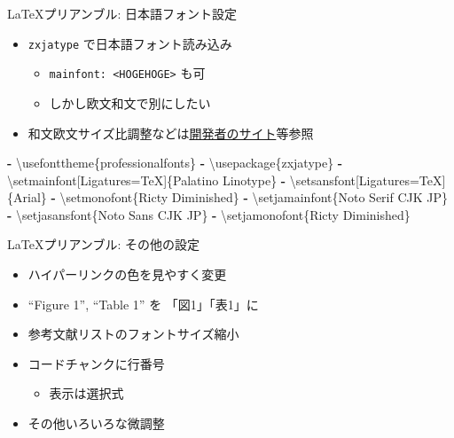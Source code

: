 \documentclass[
  14pt,
  ignorenonframetext,
]{beamer}
\newenvironment{Shaded}{\begin{snugshade}}{\end{snugshade}}
\newcommand{\AttributeTok}[1]{\textcolor[rgb]{0.77,0.63,0.00}{#1}}
\newcommand{\KeywordTok}[1]{\textcolor[rgb]{0.13,0.29,0.53}{\textbf{#1}}}
\providecommand{\tightlist}{%
  \setlength{\itemsep}{0pt}\setlength{\parskip}{0pt}}
\begin{document}
\begin{frame}[fragile]{\LaTeX プリアンブル: 日本語フォント設定}
\protect\hypertarget{ux30d7ux30eaux30a2ux30f3ux30d6ux30eb-ux65e5ux672cux8a9eux30d5ux30a9ux30f3ux30c8ux8a2dux5b9a}{}

\begin{itemize}
\tightlist
\item
  \texttt{zxjatype} で日本語フォント読み込み

  \begin{itemize}
  \tightlist
  \item
    \texttt{mainfont:\ \textless{}HOGEHOGE\textgreater{}} も可
  \item
    しかし欧文和文で別にしたい
  \end{itemize}
\item
  和文欧文サイズ比調整などは\href{http://zrbabbler.sp.land.to/zxjatype.html}{開発者のサイト}等参照
\end{itemize}

\begin{Shaded}
\begin{Highlighting}[]
\KeywordTok{-}\AttributeTok{ \textbackslash{}usefonttheme\{professionalfonts\}}
\KeywordTok{-}\AttributeTok{ \textbackslash{}usepackage\{zxjatype\}}
\KeywordTok{-}\AttributeTok{ \textbackslash{}setmainfont[Ligatures=TeX]\{Palatino Linotype\}}
\KeywordTok{-}\AttributeTok{ \textbackslash{}setsansfont[Ligatures=TeX]\{Arial\}}
\KeywordTok{-}\AttributeTok{ \textbackslash{}setmonofont\{Ricty Diminished\}}
\KeywordTok{-}\AttributeTok{ \textbackslash{}setjamainfont\{Noto Serif CJK JP\}}
\KeywordTok{-}\AttributeTok{ \textbackslash{}setjasansfont\{Noto Sans CJK JP\}}
\KeywordTok{-}\AttributeTok{ \textbackslash{}setjamonofont\{Ricty Diminished\}}
\end{Highlighting}
\end{Shaded}

\end{frame}

\begin{frame}{\LaTeX プリアンブル: その他の設定}
\protect\hypertarget{ux30d7ux30eaux30a2ux30f3ux30d6ux30eb-ux305dux306eux4ed6ux306eux8a2dux5b9a}{}

\begin{itemize}
\tightlist
\item
  ハイパーリンクの色を見やすく変更
\item
  ``Figure 1'', ``Table 1'' を 「図1」「表1」に
\item
  参考文献リストのフォントサイズ縮小
\item
  コードチャンクに行番号

  \begin{itemize}
  \tightlist
  \item
    表示は選択式
  \end{itemize}
\item
  その他いろいろな微調整
\end{itemize}

\end{frame}
\end{document}
